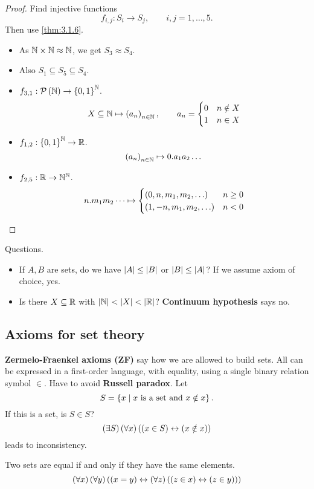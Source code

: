 \begin{proof}
Find injective functions
$$ f_{i, j} : S_i \to S_j, \qquad i, j = 1, \dots, 5. $$
Then use \ref{thm:3.1.6}.
\begin{itemize}
\item As $ \mathbb{N} \times \mathbb{N} \approx \mathbb{N} $, we get $ S_3 \approx S_4 $.
\item Also $ S_1 \subseteq S_5 \subseteq S_4 $.
\item $ f_{3, 1} : \mathcal{P}\left( \mathbb{N} \right) \to \left\{ 0, 1 \right\}^{\mathbb{N}} $.
$$ X \subseteq \mathbb{N} \mapsto \left( a_n \right)_{n \in \mathbb{N}}, \qquad a_n =
\begin{cases}
0 & n \notin X \\
1 & n \in X
\end{cases}
$$
\item $ f_{1, 2} : \left\{ 0, 1 \right\}^{\mathbb{N}} \to \mathbb{R} $.
$$ \left( a_n \right)_{n \in \mathbb{N}} \mapsto 0 . a_1a_2 \dots $$
\item $ f_{2, 5} : \mathbb{R} \to \mathbb{N}^{\mathbb{N}} $.
$$ n . m_1m_2 \dots \mapsto
\begin{cases}
\rb{0, n, m_1, m_2, \dots} & n \ge 0 \\
\rb{1, -n, m_1, m_2, \dots} & n < 0
\end{cases}
$$
\end{itemize}
\end{proof}

\pagebreak

Questions.
\begin{itemize}
\item If $ A, B $ are sets, do we have $ \left\lvert A \right\rvert \le \left\lvert B \right\rvert $ or $ \left\lvert B \right\rvert \le \left\lvert A \right\rvert $? If we assume axiom of choice, yes.
\item Is there $ X \subseteq \mathbb{R} $ with $ \left\lvert \mathbb{N} \right\rvert < \left\lvert X \right\rvert < \left\lvert \mathbb{R} \right\rvert $? \textbf{Continuum hypothesis} says no.
\end{itemize}

\subsection{Axioms for set theory}

\textbf{Zermelo-Fraenkel axioms (ZF)} say how we are allowed to build sets. All can be expressed in a first-order language, with equality, using a single binary relation symbol $ \in $. Have to avoid \textbf{Russell paradox}. Let
$$ S = \left\{ x \mid x \ \text{is a set and} \ x \notin x \right\}. $$
If this is a set, is $ S \in S $?
$$ \left( \exists S \right)\left( \forall x \right)\left( \left( x \in S \right) \leftrightarrow \left( x \notin x \right) \right) $$
leads to inconsistency.

\begin{axiom}
Two sets are equal if and only if they have the same elements.
$$ \left( \forall x \right)\left( \forall y \right)\left( \left( x = y \right) \leftrightarrow \left( \forall z \right)\left( \left( z \in x \right) \leftrightarrow \left( z \in y \right) \right) \right) $$
\end{axiom}

